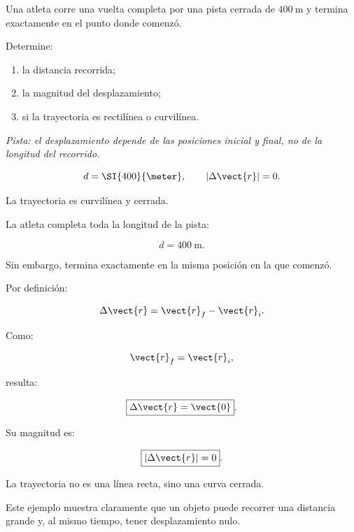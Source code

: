 \begin{ejercicio}
Una atleta corre una vuelta completa por una pista cerrada de \(\SI{400}{\meter}\) y termina exactamente en el punto donde comenzó.

Determine:

\begin{enumerate}[label=\alph*)]
    \item la distancia recorrida;
    \item la magnitud del desplazamiento;
    \item si la trayectoria es rectilínea o curvilínea.
\end{enumerate}

\textit{Pista: el desplazamiento depende de las posiciones inicial y final, no de la longitud del recorrido.}
\end{ejercicio}

\begin{respuesta}
\[
d=\SI{400}{\meter},
\qquad
|\Delta\vect{r}|=0.
\]

La trayectoria es curvilínea y cerrada.
\end{respuesta}

\begin{explicacion}
La atleta completa toda la longitud de la pista:

\[ \boxed{d=\SI{400}{\meter}}. \]

Sin embargo, termina exactamente en la misma posición en la que comenzó.

Por definición:

\[ \Delta\vect{r}=\vect{r}_f-\vect{r}_i. \]

Como:

\[ \vect{r}_f=\vect{r}_i, \]

resulta:

\[ \boxed{\Delta\vect{r}=\vect{0}}. \]

Su magnitud es:

\[ \boxed{|\Delta\vect{r}|=0}. \]

La trayectoria no es una línea recta, sino una curva cerrada.

Este ejemplo muestra claramente que un objeto puede recorrer una distancia grande y, al mismo tiempo, tener desplazamiento nulo.
\end{explicacion}


